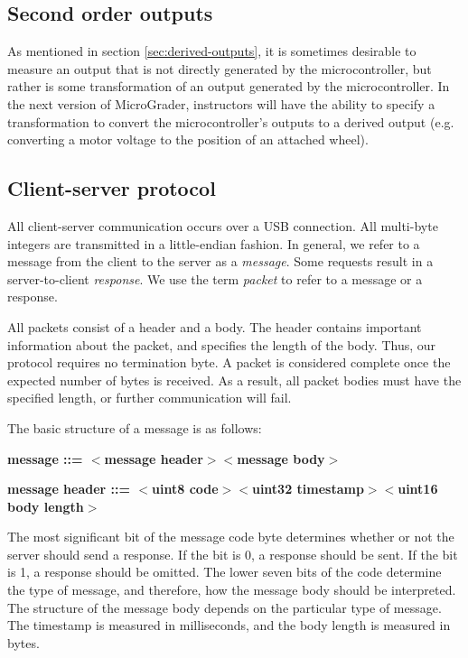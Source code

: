 \documentclass[12pt]{article}
\begin{document}
\subsection{Second order outputs}
As mentioned in section \ref{sec:derived-outputs}, it is sometimes desirable to measure an output that is not directly generated by the microcontroller, but rather is some transformation of an output generated by the microcontroller.  In the next version of MicroGrader, instructors will have the ability to specify a transformation to convert the microcontroller's outputs to a derived output (e.g. converting a motor voltage to the position of an attached wheel).

\clearpage
\begin{appendices}
\section{Client-server protocol}
\label{sec:protocol}
All client-server communication occurs over a USB connection.  All multi-byte integers are transmitted in a little-endian fashion.  In general, we refer to a message from the client to the server as a \textit{message}.  Some requests result in a server-to-client \textit{response}.  We use the term \textit{packet} to refer to a message or a response.

All packets consist of a header and a body.  The header contains important information about the packet, and specifies the length of the body. Thus, our protocol requires no termination byte.  A packet is considered complete once the expected number of bytes is received.  As a result, all packet bodies must have the specified length, or further communication will fail.

The basic structure of a message is as follows:

\textbf{message ::= $<$message header$>$$<$message body$>$}

\textbf{message header ::= $<$uint8 code$>$$<$uint32 timestamp$>$$<$uint16 body length$>$}

\noindent The most significant bit of the message code byte determines whether or not the server should send a response.  If the bit is 0, a response should be sent.  If the bit is 1, a response should be omitted.  The lower seven bits of the code determine the type of message, and therefore, how the message body should be interpreted.  The structure of the message body depends on the particular type of message.  The timestamp is measured in milliseconds, and the body length is measured in bytes.


\end{appendices}
\end{document}
